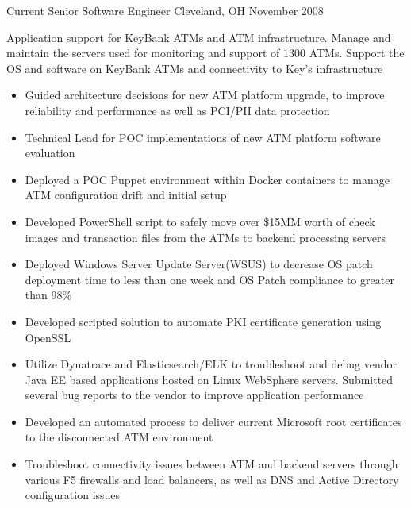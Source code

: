 %
%
%

\begin{experiences}
  \experience
    {Current}       {Senior Software Engineer}
                    {}{Cleveland, OH}
    {November 2008} {
                      Application support for KeyBank ATMs and ATM infrastructure. Manage and maintain the servers used for monitoring and support of 1300 ATMs. Support the OS and software on KeyBank ATMs and connectivity to Key's infrastructure
                      \begin{itemize}
                        \item Guided architecture decisions for new ATM platform upgrade, to improve reliability and performance as well as PCI/PII data protection
                        \item Technical Lead for POC implementations of new ATM platform software evaluation
                        \item Deployed a POC Puppet environment within Docker containers to manage ATM configuration drift and initial setup
                        \item Developed PowerShell script to safely move over \$15MM worth of check images and transaction files from the ATMs to backend processing servers
                        \item Deployed Windows Server Update Server(WSUS) to decrease OS patch deployment time to less than one week and OS Patch compliance to greater than 98\%
                        \item Developed scripted solution to automate PKI certificate generation using OpenSSL
                        \item Utilize Dynatrace and Elasticsearch/ELK to troubleshoot and debug vendor Java EE based applications hosted on Linux WebSphere servers. Submitted several bug reports to the vendor to improve application performance
                        \item Developed an automated process to deliver current Microsoft root certificates to the disconnected ATM environment
                        \item Troubleshoot connectivity issues between ATM and backend servers through various F5 firewalls and load balancers, as well as DNS and Active Directory configuration issues

\end{itemize}}
\end{experiences}
